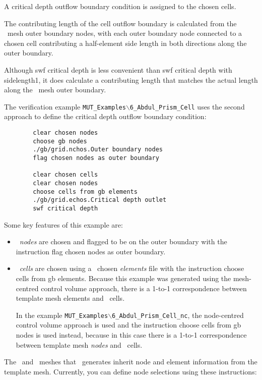     {
          A critical depth outflow boundary condition is assigned to the chosen cells.

          The contributing length of the cell outflow boundary is calculated from the \swf\ mesh outer boundary nodes, with each outer boundary node connected to a chosen cell contributing a half-element side length in both directions along the outer boundary.
    }

Although \textsf{swf critical depth} is less convenient than \textsf{swf critical depth with sidelength1}, it does calculate a contributing length that matches the actual length along the \swf\ mesh outer boundary.

The verification example \texttt{MUT\_Examples$\backslash$6\_Abdul\_Prism\_Cell} uses the second approach to define the critical depth outflow boundary condition:
\begin{verbatim}
        clear chosen nodes
        choose gb nodes
        ./gb/grid.nchos.Outer boundary nodes
        flag chosen nodes as outer boundary

        clear chosen cells
        clear chosen nodes
        choose cells from gb elements
        ./gb/grid.echos.Critical depth outlet
        swf critical depth
\end{verbatim}

Some key features of this example are:
\begin{itemize}
    \item \swf\ {\em nodes} are chosen and flagged to be on the outer boundary with the instruction \textsf{flag chosen nodes as outer boundary}.
    \item \swf\ {\em cells} are chosen using a \gb\ chosen {\em elements} file with the instruction \textsf{choose cells from gb elements}.  Because this example was generated using the mesh-centred control volume approach, there is a 1-to-1 correspondence between template mesh elements and \swf\ cells.

        In the example \texttt{MUT\_Examples$\backslash$6\_Abdul\_Prism\_Cell\_nc}, the node-centred control volume approach is used and the instruction \textsf{choose cells from gb nodes} is used instead, because in this case there is a 1-to-1 correspondence between template mesh {\em nodes} and \swf\ cells.
\end{itemize}

The \swf\ and \gwf\ meshes that \mut\ generates inherit node and element information from the template mesh.  Currently, you can define node selections using these instructions: \label{page:nodeSelect}

